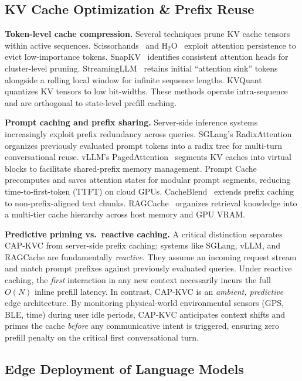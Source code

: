 \documentclass[journal]{IEEEtran}
\begin{document}
\subsection{KV Cache Optimization \& Prefix Reuse}
\label{sec:related_kvcache}

\textbf{Token-level cache compression.} Several techniques prune KV cache tensors within active sequences. Scissorhands~\cite{scissorhands} and H$_2$O~\cite{h2o} exploit attention persistence to evict low-importance tokens. SnapKV~\cite{snapkv} identifies consistent attention heads for cluster-level pruning. StreamingLLM~\cite{streamingllm} retains initial ``attention sink'' tokens alongside a rolling local window for infinite sequence lengths. KVQuant~\cite{kvquant} quantizes KV tensors to low bit-widths. These methods operate intra-sequence and are orthogonal to state-level prefill caching.

\textbf{Prompt caching and prefix sharing.} Server-side inference systems increasingly exploit prefix redundancy across queries. SGLang's RadixAttention~\cite{sglang} organizes previously evaluated prompt tokens into a radix tree for multi-turn conversational reuse. vLLM's PagedAttention~\cite{vllm} segments KV caches into virtual blocks to facilitate shared-prefix memory management. Prompt Cache~\cite{promptcache} precomputes and saves attention states for modular prompt segments, reducing time-to-first-token (TTFT) on cloud GPUs. CacheBlend~\cite{cacheblend} extends prefix caching to non-prefix-aligned text chunks. RAGCache~\cite{ragcache} organizes retrieval knowledge into a multi-tier cache hierarchy across host memory and GPU VRAM.

\textbf{Predictive priming vs.\ reactive caching.} A critical distinction separates CAP-KVC from server-side prefix caching: systems like SGLang, vLLM, and RAGCache are fundamentally \emph{reactive}. They assume an incoming request stream and match prompt prefixes against previously evaluated queries. Under reactive caching, the \emph{first} interaction in any new context necessarily incurs the full $O(N)$ inline prefill latency. In contrast, CAP-KVC is an \emph{ambient, predictive} edge architecture. By monitoring physical-world environmental sensors (GPS, BLE, time) during user idle periods, CAP-KVC anticipates context shifts and primes the cache \emph{before} any communicative intent is triggered, ensuring zero prefill penalty on the critical first conversational turn.

\subsection{Edge Deployment of Language Models}
\label{sec:related_edge}
\end{document}
